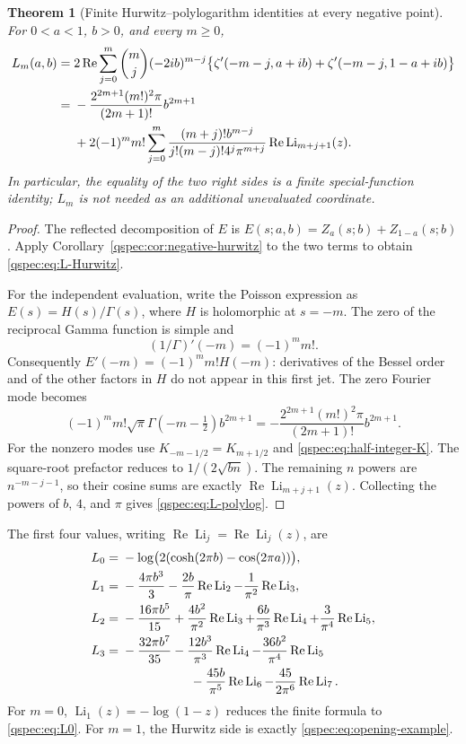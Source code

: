 \documentclass[11pt,letterpaper]{article}
\numberwithin{equation}{section}
\newtheorem{theorem}{Theorem}[section]
\theoremstyle{definition}
\newcommand{\Li}{\operatorname{Li}}
\newcommand{\Rea}{\operatorname{Re}}
\begin{document}
\begin{theorem}[Finite Hurwitz--polylogarithm identities at every negative point]
\label{qspec:thm:finite}
For $0<a<1$, $b>0$, and every $m\ge0$,
\begin{align}
L_m(a,b)={}&2\Rea\sum_{j=0}^m\binom mj(-2ib)^{m-j}
\bigl\{\zeta'(-m-j,a+ib)+\zeta'(-m-j,1-a+ib)\bigr\}\label{qspec:eq:L-Hurwitz}\\
={}&-\frac{2^{2m+1}(m!)^2\pi}{(2m+1)!}b^{2m+1}\notag\\
&+2(-1)^mm!\sum_{j=0}^m
\frac{(m+j)!b^{m-j}}{j!(m-j)!4^j\pi^{m+j}}
\Rea\Li_{m+j+1}(z).
\label{qspec:eq:L-polylog}
\end{align}
In particular, the equality of the two right sides is a finite special-function
identity; $L_m$ is not needed as an additional unevaluated coordinate.
\end{theorem}
\begin{proof}
The reflected decomposition of $E$ is
$E(s;a,b)=Z_a(s;b)+Z_{1-a}(s;b)$. Apply
Corollary~\ref{qspec:cor:negative-hurwitz} to the two terms to obtain
\eqref{qspec:eq:L-Hurwitz}.

For the independent evaluation, write the Poisson expression as
$E(s)=H(s)/\Gamma(s)$, where $H$ is holomorphic at $s=-m$. The zero
of the reciprocal Gamma function is simple and
\[
(1/\Gamma)'(-m)=(-1)^mm!.
\]
Consequently $E'(-m)=(-1)^mm!H(-m)$: derivatives of the Bessel order
and of the other factors in $H$ do not appear in this first jet. The
zero Fourier mode becomes
\[
(-1)^mm!\sqrt\pi\Gamma(-m-\tfrac12)b^{2m+1}
=-\frac{2^{2m+1}(m!)^2\pi}{(2m+1)!}b^{2m+1}.
\]
For the nonzero modes use $K_{-m-1/2}=K_{m+1/2}$ and
\eqref{qspec:eq:half-integer-K}. The square-root prefactor reduces to
$1/(2\sqrt{bn})$. The remaining $n$ powers are
$n^{-m-j-1}$, so their cosine sums are exactly
$\Rea\Li_{m+j+1}(z)$. Collecting the powers of $b$, $4$, and $\pi$
gives \eqref{qspec:eq:L-polylog}.
\end{proof}

The first four values, writing $\Rea\Li_j=\Rea\Li_j(z)$, are
\begin{align}
L_0={}&-\log\bigl(2(\cosh(2\pi b)-\cos(2\pi a))\bigr),\label{qspec:eq:L0}\\
L_1={}&-\frac{4\pi b^3}{3}-\frac{2b}{\pi}\Rea\Li_2
                       -\frac1{\pi^2}\Rea\Li_3,\label{qspec:eq:L1}\\
L_2={}&-\frac{16\pi b^5}{15}+\frac{4b^2}{\pi^2}\Rea\Li_3
              +\frac{6b}{\pi^3}\Rea\Li_4+\frac3{\pi^4}\Rea\Li_5,\label{qspec:eq:L2}\\
L_3={}&-\frac{32\pi b^7}{35}-\frac{12b^3}{\pi^3}\Rea\Li_4
              -\frac{36b^2}{\pi^4}\Rea\Li_5\notag\\
     &\hspace{19mm}-\frac{45b}{\pi^5}\Rea\Li_6
              -\frac{45}{2\pi^6}\Rea\Li_7.
\label{qspec:eq:L3}
\end{align}
For $m=0$, $\Li_1(z)=-\log(1-z)$ reduces the finite formula to
\eqref{qspec:eq:L0}. For $m=1$, the Hurwitz side is exactly
\eqref{qspec:eq:opening-example}.
\end{document}

